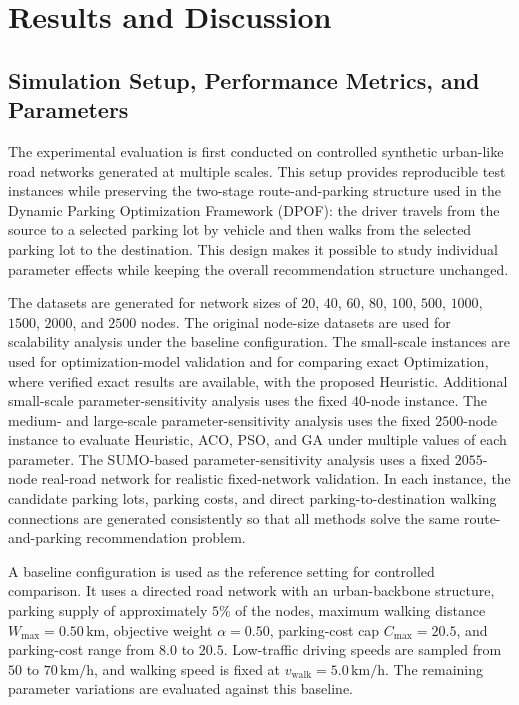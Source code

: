 \section{Results and Discussion}

\subsection{Simulation Setup, Performance Metrics, and Parameters}

The experimental evaluation is first conducted on controlled synthetic urban-like road networks generated at multiple scales. This setup provides reproducible test instances while preserving the two-stage route-and-parking structure used in the Dynamic Parking Optimization Framework (DPOF): the driver travels from the source to a selected parking lot by vehicle and then walks from the selected parking lot to the destination. This design makes it possible to study individual parameter effects while keeping the overall recommendation structure unchanged.

The datasets are generated for network sizes of \(20\), \(40\), \(60\), \(80\), \(100\), \(500\), \(1000\), \(1500\), \(2000\), and \(2500\) nodes. The original node-size datasets are used for scalability analysis under the baseline configuration. The small-scale instances are used for optimization-model validation and for comparing exact Optimization, where verified exact results are available, with the proposed Heuristic. Additional small-scale parameter-sensitivity analysis uses the fixed \(40\)-node instance. The medium- and large-scale parameter-sensitivity analysis uses the fixed \(2500\)-node instance to evaluate Heuristic, ACO, PSO, and GA under multiple values of each parameter. The SUMO-based parameter-sensitivity analysis uses a fixed \(2055\)-node real-road network for realistic fixed-network validation. In each instance, the candidate parking lots, parking costs, and direct parking-to-destination walking connections are generated consistently so that all methods solve the same route-and-parking recommendation problem.

A baseline configuration is used as the reference setting for controlled comparison. It uses a directed road network with an urban-backbone structure, parking supply of approximately \(5\%\) of the nodes, maximum walking distance \(W_{\max}=0.50\,\mathrm{km}\), objective weight \(\alpha=0.50\), parking-cost cap \(C_{\max}=20.5\), and parking-cost range from \(8.0\) to \(20.5\). Low-traffic driving speeds are sampled from \(50\) to \(70\,\mathrm{km/h}\), and walking speed is fixed at \(v_{\mathrm{walk}}=5.0\,\mathrm{km/h}\). The remaining parameter variations are evaluated against this baseline.

